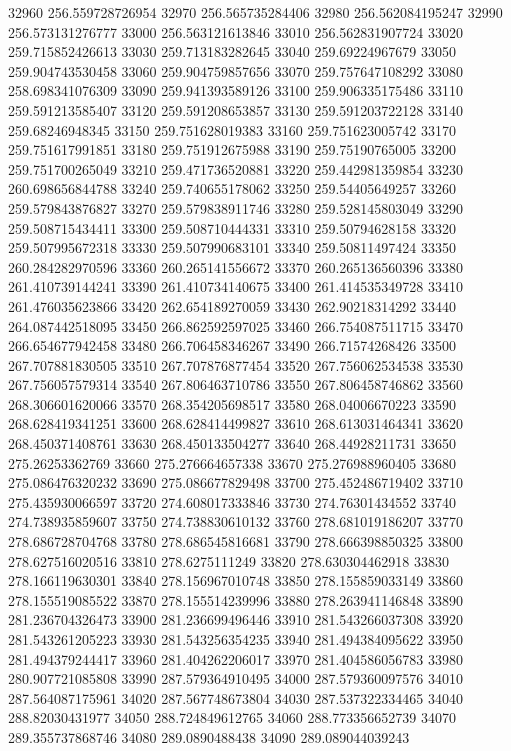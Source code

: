 {32960 256.559728726954
32970 256.565735284406
32980 256.562084195247
32990 256.573131276777
33000 256.563121613846
33010 256.562831907724
33020 259.715852426613
33030 259.713183282645
33040 259.69224967679
33050 259.904743530458
33060 259.904759857656
33070 259.757647108292
33080 258.698341076309
33090 259.941393589126
33100 259.906335175486
33110 259.591213585407
33120 259.591208653857
33130 259.591203722128
33140 259.68246948345
33150 259.751628019383
33160 259.751623005742
33170 259.751617991851
33180 259.751912675988
33190 259.75190765005
33200 259.751700265049
33210 259.471736520881
33220 259.442981359854
33230 260.698656844788
33240 259.740655178062
33250 259.54405649257
33260 259.579843876827
33270 259.579838911746
33280 259.528145803049
33290 259.508715434411
33300 259.508710444331
33310 259.50794628158
33320 259.507995672318
33330 259.507990683101
33340 259.50811497424
33350 260.284282970596
33360 260.265141556672
33370 260.265136560396
33380 261.410739144241
33390 261.410734140675
33400 261.414535349728
33410 261.476035623866
33420 262.654189270059
33430 262.90218314292
33440 264.087442518095
33450 266.862592597025
33460 266.754087511715
33470 266.654677942458
33480 266.706458346267
33490 266.71574268426
33500 267.707881830505
33510 267.707876877454
33520 267.756062534538
33530 267.756057579314
33540 267.806463710786
33550 267.806458746862
33560 268.306601620066
33570 268.354205698517
33580 268.04006670223
33590 268.628419341251
33600 268.628414499827
33610 268.613031464341
33620 268.450371408761
33630 268.450133504277
33640 268.44928211731
33650 275.26253362769
33660 275.276664657338
33670 275.276988960405
33680 275.086476320232
33690 275.086677829498
33700 275.452486719402
33710 275.435930066597
33720 274.608017333846
33730 274.76301434552
33740 274.738935859607
33750 274.738830610132
33760 278.681019186207
33770 278.686728704768
33780 278.686545816681
33790 278.666398850325
33800 278.627516020516
33810 278.6275111249
33820 278.630304462918
33830 278.166119630301
33840 278.156967010748
33850 278.155859033149
33860 278.155519085522
33870 278.155514239996
33880 278.263941146848
33890 281.236704326473
33900 281.236699496446
33910 281.543266037308
33920 281.543261205223
33930 281.543256354235
33940 281.494384095622
33950 281.494379244417
33960 281.404262206017
33970 281.404586056783
33980 280.907721085808
33990 287.579364910495
34000 287.579360097576
34010 287.564087175961
34020 287.567748673804
34030 287.537322334465
34040 288.82030431977
34050 288.724849612765
34060 288.773356652739
34070 289.355737868746
34080 289.0890488438
34090 289.089044039243
}
